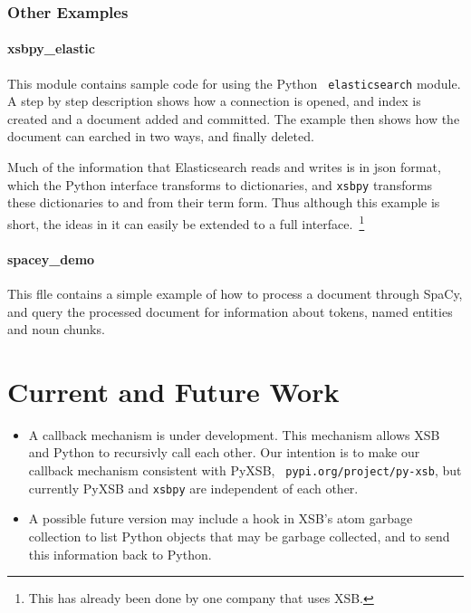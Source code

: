\subsubsection{Other Examples}

\paragraph{xsbpy\_elastic}
This module contains sample code for using the Python {\tt
  elasticsearch} module.  A step by step description shows how a
connection is opened, and index is created and a document added and
committed.  The example then shows how the document can earched in two
ways, and finally deleted.

Much of the information that Elasticsearch reads and writes is in json
format, which the Python interface transforms to dictionaries, and
{\tt xsbpy} transforms these dictionaries to and from their term form.
Thus although this example is short, the ideas in it can easily be
extended to a full interface.~\footnote{This has already been done by
  one company that uses XSB.}

\paragraph{spacey\_demo}
This flle contains a simple example of how to process a document
through SpaCy, and query the processed document for
information about tokens, named entities and noun chunks.


\section{Current and Future Work}

\begin{itemize}
\item A callback mechanism is under development.  This mechanism
  allows XSB and Python to recursivly call each other.  Our intention
  is to make our callback mechanism consistent with PyXSB, {\tt
    pypi.org/project/py-xsb}, but currently PyXSB and {\tt xsbpy} are
  independent of each other.

\item A possible future version may include a hook in XSB's atom
  garbage collection to list Python objects that may be garbage
  collected, and to send this information back to Python.  
\end{itemize}  
